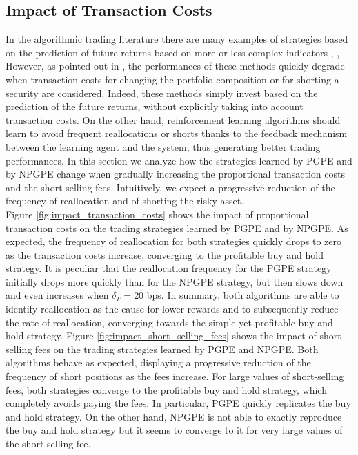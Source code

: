 \subsection{Impact of Transaction Costs}
In the algorithmic trading literature there are many examples of strategies based on the prediction of future returns based on more or less complex indicators \cite{kamijo1990stock}, \cite{saad1998comparative}, \cite{liang2011stock}. However, as pointed out in \cite{deng2016deep}, the performances of these methods quickly degrade when transaction costs for changing the portfolio composition or for shorting a security
are considered. Indeed, these methods simply invest based on the prediction of the future returns, without explicitly taking into account transaction costs. On the other hand, reinforcement learning algorithms should learn to avoid frequent reallocations or shorts thanks to the feedback mechanism between the learning agent and the system, thus generating better trading performances. In this section we analyze how the strategies learned by PGPE and by NPGPE change when gradually increasing the proportional transaction costs and the short-selling fees. Intuitively, we expect a progressive reduction of the frequency of reallocation and of shorting the risky asset.\\
Figure \ref{fig:impact_transaction_costs} shows the impact of proportional transaction costs on the trading strategies learned by PGPE and by NPGPE. As expected, the frequency of reallocation for both strategies quickly drops to zero as the transaction costs increase, converging to the profitable buy and hold strategy. It is peculiar that the reallocation frequency for the PGPE strategy initially drops more quickly than for the NPGPE strategy, but then slows down and even increases when $\delta_P = 20$ bps.
In summary, both algorithms are able to identify reallocation as the cause for lower rewards and to subsequently reduce the rate of reallocation, converging towards the simple yet profitable buy and hold strategy. Figure \ref{fig:impact_short_selling_fees} shows the impact of short-selling fees on the trading strategies learned by PGPE and NPGPE. Both algorithms behave as expected, displaying a progressive reduction of the frequency of short positions as the fees increase. For large values of short-selling fees, both strategies converge to the profitable buy and hold strategy, which completely avoids paying the fees. In particular, PGPE quickly replicates the buy and hold strategy. On the other hand, NPGPE is not able to exactly reproduce the buy and hold strategy but it seems to converge to it for very large values of the short-selling fee. 

